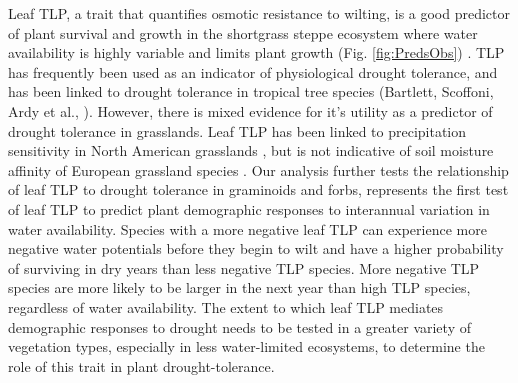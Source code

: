 \documentclass[12pt, letterpaper]{article}
\begin{document}
Leaf TLP, a trait that quantifies osmotic resistance to wilting, is a good predictor of plant survival and growth in the shortgrass steppe ecosystem where water availability is highly variable and limits plant growth (Fig. \ref{fig:PredsObs}) \cite{Lauenroth1992Long-TermSteppe}. TLP has frequently been used as an indicator of physiological drought tolerance, and has been linked to drought tolerance in tropical tree species (Bartlett, Scoffoni, Ardy et al., ). However, there is mixed evidence for it’s utility as a predictor of drought tolerance in grasslands. Leaf TLP has been linked to precipitation sensitivity in North American grasslands \cite{Griffin-Nolan2019, Blumenthal2020, Wilcox2020PlantPrairie}, but is not indicative of soil moisture affinity of European grassland species . Our analysis further tests the relationship of leaf TLP to drought tolerance in graminoids and forbs, represents the first test of leaf TLP to predict plant demographic responses to interannual variation in water availability. Species with a more negative leaf TLP can experience more negative water potentials before they begin to wilt and have a higher probability of surviving in dry years than less negative TLP species. More negative TLP species are more likely to be larger in the next year than high TLP species, regardless of water availability. The extent to which leaf TLP mediates demographic responses to drought needs to be tested in a greater variety of vegetation types, especially in less water-limited ecosystems, to determine the role of this trait in plant drought-tolerance.
\end{document}
